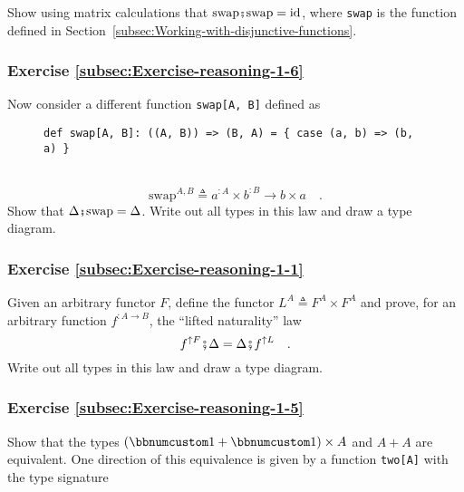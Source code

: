 Show using matrix calculations that $\text{swap}\bef\text{swap}=\text{id}$,
where \lstinline!swap! is the function defined in Section~\ref{subsec:Working-with-disjunctive-functions}.

\subsubsection{Exercise \label{subsec:Exercise-reasoning-1-6}\ref{subsec:Exercise-reasoning-1-6}}

Now consider a different function \lstinline!swap[A, B]! defined
as

\begin{wrapfigure}{L}{0.63\columnwidth}%
\vspace{-0.9\baselineskip}
\begin{lstlisting}
def swap[A, B]: ((A, B)) => (B, A) = { case (a, b) => (b, a) }
\end{lstlisting}

\vspace{-0.25\baselineskip}
\end{wrapfigure}%

~\vspace{-1.25\baselineskip}
\[
\text{swap}^{A,B}\triangleq a^{:A}\times b^{:B}\rightarrow b\times a\quad.
\]
\vspace{-0.15\baselineskip}
Show that $\Delta\bef\text{swap}=\Delta$. Write out all types in
this law and draw a type diagram.

\subsubsection{Exercise \label{subsec:Exercise-reasoning-1-1}\ref{subsec:Exercise-reasoning-1-1}}

Given an arbitrary functor $F$, define the functor $L^{A}\triangleq F^{A}\times F^{A}$
and prove, for an arbitrary function $f^{:A\rightarrow B}$, the \textsf{``}lifted
naturality\textsf{''} law
\[
f^{\uparrow F}\bef\Delta=\Delta\bef f^{\uparrow L}\quad.
\]
Write out all types in this law and draw a type diagram.

\subsubsection{Exercise \label{subsec:Exercise-reasoning-1-5}\ref{subsec:Exercise-reasoning-1-5}}

Show that the types $(\bbnum 1+\bbnum 1)\times A$ and $A+A$ are
equivalent. One direction of this equivalence is given by a function
\lstinline!two[A]! with the type signature

